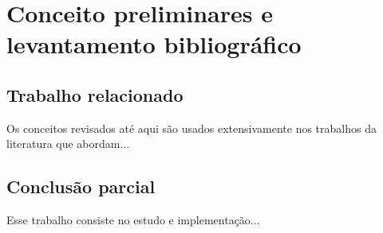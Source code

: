 
\clearpage
\section{Conceito preliminares e levantamento bibliográfico}\label{sec:background}

\subsection{Trabalho relacionado} 

Os conceitos revisados até aqui são usados extensivamente nos trabalhos da literatura que abordam... 

\subsection{Conclusão parcial}

Esse trabalho consiste no estudo e implementação... 

